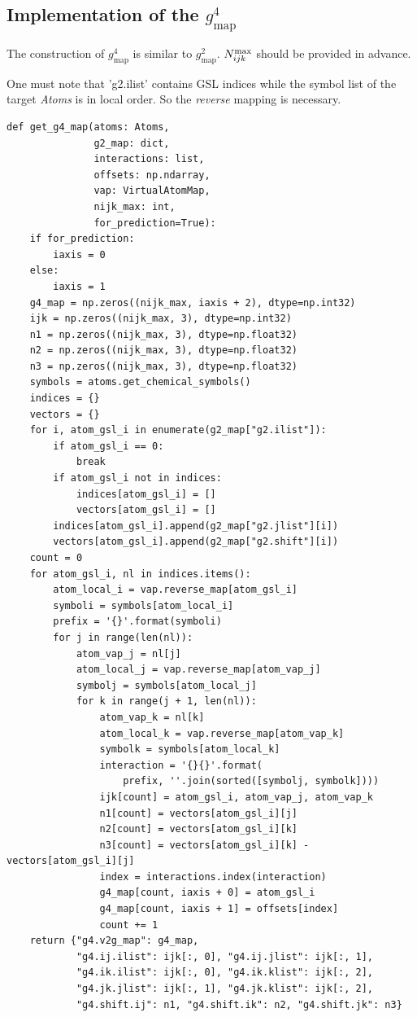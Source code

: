 \documentclass[preprint]{revtex4-2}
\begin{document}
% 
%
\subsection{Implementation of the \texorpdfstring{$g^4_{\mathrm{map}}$}{g4map}}

The construction of $g^4_{\mathrm{map}}$ is similar to $g^2_{\mathrm{map}}$. 
$N_{ijk}^{\mathrm{max}}$ should be provided in advance. 

One must note that \textmd{'g2.ilist'} contains GSL indices while the symbol 
list of the target \textit{Atoms} is in local order. So the \textit{reverse} 
mapping is necessary.

\begin{verbatim}
def get_g4_map(atoms: Atoms,
               g2_map: dict,
               interactions: list,
               offsets: np.ndarray,
               vap: VirtualAtomMap,
               nijk_max: int,
               for_prediction=True):
    if for_prediction:
        iaxis = 0
    else:
        iaxis = 1
    g4_map = np.zeros((nijk_max, iaxis + 2), dtype=np.int32)
    ijk = np.zeros((nijk_max, 3), dtype=np.int32)
    n1 = np.zeros((nijk_max, 3), dtype=np.float32)
    n2 = np.zeros((nijk_max, 3), dtype=np.float32)
    n3 = np.zeros((nijk_max, 3), dtype=np.float32)
    symbols = atoms.get_chemical_symbols()
    indices = {}
    vectors = {}
    for i, atom_gsl_i in enumerate(g2_map["g2.ilist"]):
        if atom_gsl_i == 0:
            break
        if atom_gsl_i not in indices:
            indices[atom_gsl_i] = []
            vectors[atom_gsl_i] = []
        indices[atom_gsl_i].append(g2_map["g2.jlist"][i])
        vectors[atom_gsl_i].append(g2_map["g2.shift"][i])
    count = 0
    for atom_gsl_i, nl in indices.items():
        atom_local_i = vap.reverse_map[atom_gsl_i]
        symboli = symbols[atom_local_i]
        prefix = '{}'.format(symboli)
        for j in range(len(nl)):
            atom_vap_j = nl[j]
            atom_local_j = vap.reverse_map[atom_vap_j]
            symbolj = symbols[atom_local_j]
            for k in range(j + 1, len(nl)):
                atom_vap_k = nl[k]
                atom_local_k = vap.reverse_map[atom_vap_k]
                symbolk = symbols[atom_local_k]
                interaction = '{}{}'.format(
                    prefix, ''.join(sorted([symbolj, symbolk])))
                ijk[count] = atom_gsl_i, atom_vap_j, atom_vap_k
                n1[count] = vectors[atom_gsl_i][j]
                n2[count] = vectors[atom_gsl_i][k]
                n3[count] = vectors[atom_gsl_i][k] - vectors[atom_gsl_i][j]
                index = interactions.index(interaction)
                g4_map[count, iaxis + 0] = atom_gsl_i
                g4_map[count, iaxis + 1] = offsets[index]
                count += 1
    return {"g4.v2g_map": g4_map,
            "g4.ij.ilist": ijk[:, 0], "g4.ij.jlist": ijk[:, 1],
            "g4.ik.ilist": ijk[:, 0], "g4.ik.klist": ijk[:, 2],
            "g4.jk.jlist": ijk[:, 1], "g4.jk.klist": ijk[:, 2],
            "g4.shift.ij": n1, "g4.shift.ik": n2, "g4.shift.jk": n3}
\end{verbatim}
\end{document}
